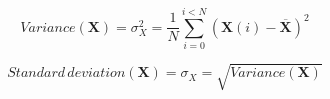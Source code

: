 \documentclass[english,a4paper,12pt,oneside]{article}
\begin{document}
\begin{equation}
 Variance(\mathbf{X}) = \sigma^2_X = \frac{1}{N}\sum_{i=0}^{i < N}\left(\mathbf{X}(i) - \overline{\mathbf{X}}\right)^2
\end{equation}

\begin{equation}
 Standard\,deviation(\mathbf{X}) = \sigma_X = \sqrt{Variance(\mathbf{X})}
 \label{eq:std dev}
\end{equation}



% 





% 
% 
% 
\end{document}
